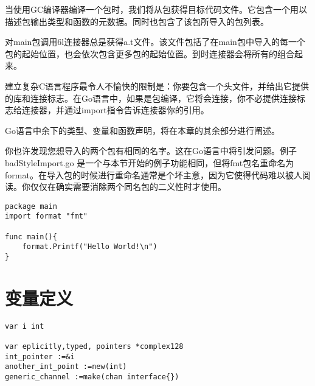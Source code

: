 当使用GC编译器编译一个包时，我们将从包获得目标代码文件。它包含一个用以描述包输出类型和函数的元数据。同时也包含了该包所导入的包列表。

对main包调用6l连接器总是获得a.t文件。该文件包括了在main包中导入的每一个包的起始位置，也会依次包含更多包的起始位置。到时连接器会将所有的组合起来。

建立复杂C语言程序最令人不愉快的限制是：你要包含一个头文件，并给出它提供的库和连接标志。在Go语言中，如果是包编译，它将会连接，你不必提供连接标志给连接器，并通过import指令告诉连接器你的引用。

Go语言中余下的类型、变量和函数声明，将在本章的其余部分进行阐述。

你也许发现您想导入的两个包有相同的名字。这在Go语言中将引发问题。例子badStyleImport.go 是一个与本节开始的例子功能相同，但将fmt包名重命名为format。在导入包的时候进行重命名通常是个坏主意，因为它使得代码难以被人阅读。你仅仅在确实需要消除两个同名包的二义性时才使用。

\begin{lstlisting}
package main
import format "fmt"

func main(){
	format.Printf("Hello World!\n")
}
\end{lstlisting}

\section{变量定义}
\begin{lstlisting}
var i int

var eplicitly,typed, pointers *complex128
int_pointer :=&i 
another_int_point :=new(int)
generic_channel :=make(chan interface{})
\end{lstlisting}
\endinput